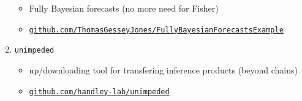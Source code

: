 \documentclass[aspectratio=169]{beamer}
\begin{document}
\begin{frame}
\begin{enumerate}
\begin{itemize}
                \item Fully Bayesian forecasts (no more need for Fisher)
                \item \texttt{\href{https://github.com/ThomasGesseyJones/FullyBayesianForecastsExample}{github.com/ThomasGesseyJones/FullyBayesianForecastsExample}} 
            \end{itemize}
        \item \texttt{unimpeded}
            \begin{itemize}
                \item up/downloading tool for transfering inference products (beyond chains)
                \item \texttt{\href{https://github.com/handley-lab/unimpeded}{github.com/handley-lab/unimpeded}} 
            \end{itemize}
    \end{enumerate}
\end{frame}
 
 
\end{document}
